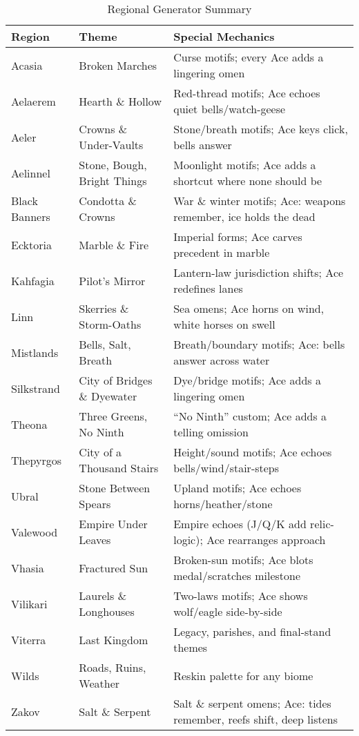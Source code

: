 \begin{table}[htbp]
\centering
\begin{tabular}{p{3.3cm}p{5.3cm}p{5.0cm}}
\toprule
\textbf{Region} & \textbf{Theme} & \textbf{Special Mechanics} \\
\midrule
Acasia & Broken Marches & Curse motifs; every Ace adds a lingering omen \\
Aelaerem & Hearth \& Hollow & Red-thread motifs; Ace echoes quiet bells/watch-geese \\
Aeler & Crowns \& Under-Vaults & Stone/breath motifs; Ace keys click, bells answer \\
Aelinnel & Stone, Bough, Bright Things & Moonlight motifs; Ace adds a shortcut where none should be \\
Black Banners & Condotta \& Crowns & War \& winter motifs; Ace: weapons remember, ice holds the dead \\
Ecktoria & Marble \& Fire & Imperial forms; Ace carves precedent in marble \\
Kahfagia & Pilot's Mirror & Lantern-law jurisdiction shifts; Ace redefines lanes \\
Linn & Skerries \& Storm-Oaths & Sea omens; Ace horns on wind, white horses on swell \\
Mistlands & Bells, Salt, Breath & Breath/boundary motifs; Ace: bells answer across water \\
Silkstrand & City of Bridges \& Dyewater & Dye/bridge motifs; Ace adds a lingering omen \\
Theona & Three Greens, No Ninth & “No Ninth” custom; Ace adds a telling omission \\
Thepyrgos & City of a Thousand Stairs & Height/sound motifs; Ace echoes bells/wind/stair-steps \\
Ubral & Stone Between Spears & Upland motifs; Ace echoes horns/heather/stone \\
Valewood & Empire Under Leaves & Empire echoes (J/Q/K add relic-logic); Ace rearranges approach \\
Vhasia & Fractured Sun & Broken-sun motifs; Ace blots medal/scratches milestone \\
Vilikari & Laurels \& Longhouses & Two-laws motifs; Ace shows wolf/eagle side-by-side \\
Viterra & Last Kingdom & Legacy, parishes, and final-stand themes \\
Wilds & Roads, Ruins, Weather & Reskin palette for any biome \\
Zakov & Salt \& Serpent & Salt \& serpent omens; Ace: tides remember, reefs shift, deep listens \\
\bottomrule
\end{tabular}
\caption{Regional Generator Summary}
\label{tab:regional-summary}
\end{table}

